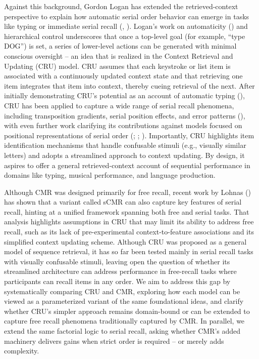\documentclass[
  man,
  floatsintext,
  longtable,
  nolmodern,
  notxfonts,
  notimes,
  draftfirst,
  colorlinks=true,linkcolor=blue,citecolor=blue,urlcolor=blue]{apa7}
\begin{document}
Against this background, Gordon Logan has extended the retrieved-context
perspective to explain how automatic serial order behavior can emerge in
tasks like typing or immediate serial recall
(,
). Logan's work on automaticity
() and hierarchical control
underscores that once a top-level goal (for example, ``type DOG'') is
set, a series of lower-level actions can be generated with minimal
conscious oversight -- an idea that is realized in the Context Retrieval
and Updating (CRU) model. CRU assumes that each keystroke or list item
is associated with a continuously updated context state and that
retrieving one item integrates that item into context, thereby cueing
retrieval of the next. After initially demonstrating CRU's potential as
an account of automatic typing (), CRU has been applied to capture a wide range of serial recall
phenomena, including transposition gradients, serial position effects,
and error patterns (), with
even further work clarifying its contributions against models focused on
positional representations of serial order
(;
;
). Importantly, CRU
highlights item identification mechanisms that handle confusable stimuli
(e.g., visually similar letters) and adopts a streamlined approach to
context updating. By design, it aspires to offer a general
retrieved-context account of sequential performance in domains like
typing, musical performance, and language production.

Although CMR was designed primarily for free recall, recent work by
Lohnas () has shown that a
variant called sCMR can also capture key features of serial recall,
hinting at a unified framework spanning both free and serial tasks. That
analysis highlights assumptions in CRU that may limit its ability to
address free recall, such as its lack of pre-experimental
context-to-feature associations and its simplified context updating
scheme. Although CRU was proposed as a general model of sequence
retrieval, it has so far been tested mainly in serial recall tasks with
visually confusable stimuli, leaving open the question of whether its
streamlined architecture can address performance in free-recall tasks
where participants can recall items in any order. We aim to address this
gap by systematically comparing CRU and CMR, exploring how each model
can be viewed as a parameterized variant of the same foundational ideas,
and clarify whether CRU's simpler approach remains domain-bound or can
be extended to capture free recall phenomena traditionally captured by
CMR. In parallel, we extend the same factorial logic to serial recall,
asking whether CMR's added machinery delivers gains when strict order is
required -- or merely adds complexity.
\end{document}
